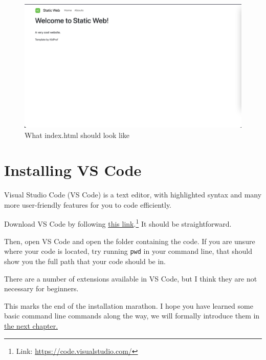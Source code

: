 \begin{figure}[h]
\centering
\includegraphics[width=15cm]{images/ch1-indexhtml.png}
\caption{What index.html should look like}
\end{figure}


\section{Installing VS Code}

Visual Studio Code (VS Code) is a text editor, with highlighted syntax and many more user-friendly features for you to code efficiently.

Download VS Code by following \href{https://code.visualstudio.com/}{this link}.\footnote{Link: \url{https://code.visualstudio.com/}} It should be straightforward.

\label{sec:pwdch1}
Then, open VS Code and open the folder containing the code. If you are unsure where your code is located, try running \texttt{pwd} in your command line, that should show you the full path that your code should be in.

There are a number of extensions available in VS Code, but I think they are not necessary for beginners.
\vspace{6mm}

This marks the end of the installation marathon. I hope you have learned some basic command line commands along the way, we will formally introduce them in \hyperref[sec:cmd]{the next chapter.}
